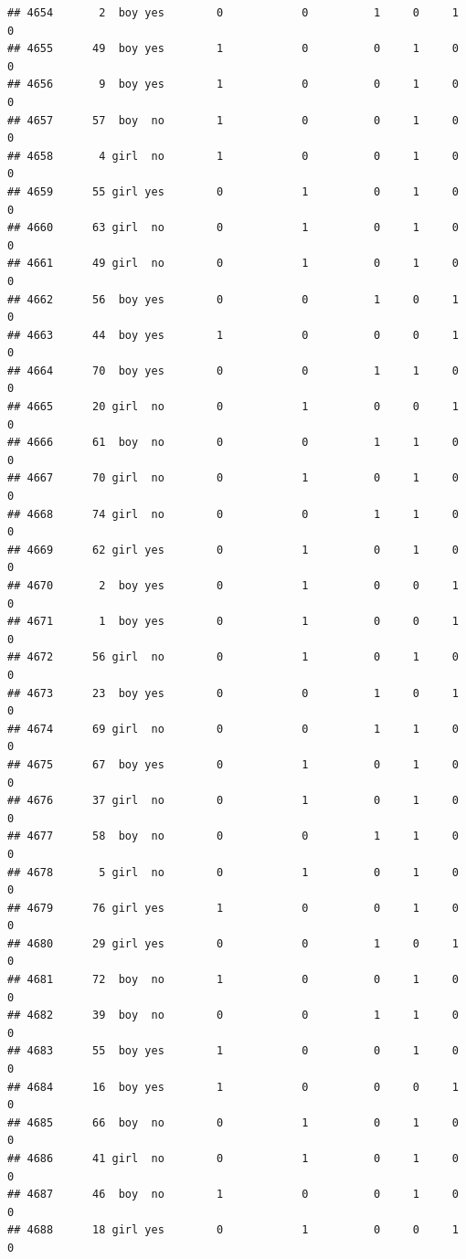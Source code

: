 \documentclass[man]{apa6}
\begin{document}
\begin{verbatim}
## 4654       2  boy yes        0            0          1     0     1     0
## 4655      49  boy yes        1            0          0     1     0     0
## 4656       9  boy yes        1            0          0     1     0     0
## 4657      57  boy  no        1            0          0     1     0     0
## 4658       4 girl  no        1            0          0     1     0     0
## 4659      55 girl yes        0            1          0     1     0     0
## 4660      63 girl  no        0            1          0     1     0     0
## 4661      49 girl  no        0            1          0     1     0     0
## 4662      56  boy yes        0            0          1     0     1     0
## 4663      44  boy yes        1            0          0     0     1     0
## 4664      70  boy yes        0            0          1     1     0     0
## 4665      20 girl  no        0            1          0     0     1     0
## 4666      61  boy  no        0            0          1     1     0     0
## 4667      70 girl  no        0            1          0     1     0     0
## 4668      74 girl  no        0            0          1     1     0     0
## 4669      62 girl yes        0            1          0     1     0     0
## 4670       2  boy yes        0            1          0     0     1     0
## 4671       1  boy yes        0            1          0     0     1     0
## 4672      56 girl  no        0            1          0     1     0     0
## 4673      23  boy yes        0            0          1     0     1     0
## 4674      69 girl  no        0            0          1     1     0     0
## 4675      67  boy yes        0            1          0     1     0     0
## 4676      37 girl  no        0            1          0     1     0     0
## 4677      58  boy  no        0            0          1     1     0     0
## 4678       5 girl  no        0            1          0     1     0     0
## 4679      76 girl yes        1            0          0     1     0     0
## 4680      29 girl yes        0            0          1     0     1     0
## 4681      72  boy  no        1            0          0     1     0     0
## 4682      39  boy  no        0            0          1     1     0     0
## 4683      55  boy yes        1            0          0     1     0     0
## 4684      16  boy yes        1            0          0     0     1     0
## 4685      66  boy  no        0            1          0     1     0     0
## 4686      41 girl  no        0            1          0     1     0     0
## 4687      46  boy  no        1            0          0     1     0     0
## 4688      18 girl yes        0            1          0     0     1     0

\end{verbatim}
\end{document}
